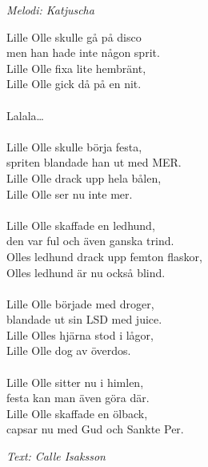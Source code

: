 {\footnotesize\textit{Melodi: Katjuscha}}\par
\vspace{10pt}
Lille Olle skulle gå på disco\\
men han hade inte någon sprit.\\
Lille Olle fixa lite hembränt,\\
Lille Olle gick då på en nit.\\
\\
Lalala…\\
\\
Lille Olle skulle börja festa,\\
spriten blandade han ut med MER.\\
Lille Olle drack upp hela bålen,\\
Lille Olle ser nu inte mer.\\
\\
Lille Olle skaffade en ledhund,\\
den var ful och även ganska trind.\\
Olles ledhund drack upp femton flaskor,\\
Olles ledhund är nu också blind.\\
\\
Lille Olle började med droger,\\
blandade ut sin LSD med juice.\\
Lille Olles hjärna stod i lågor,\\
Lille Olle dog av överdos.\\
\\
Lille Olle sitter nu i himlen,\\
festa kan man även göra där.\\
Lille Olle skaffade en ölback,\\
capsar nu med Gud och Sankte Per.
\par
\vspace{10pt}
{\footnotesize\textit{Text: Calle Isaksson}}
